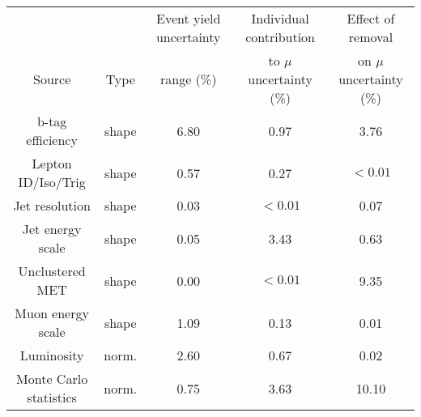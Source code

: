 \begin{adjustbox}{width=\textwidth,center=\textwidth}
\begin{tabular}{ccccc} \hline \hline
&  & Event yield uncertainty &Individual contribution & Effect of removal  \\
Source & Type & range (\%) &  to $\mu$ uncertainty (\%) & on $\mu$ uncertainty (\%) \\ \hline 
b-tag efficiency & shape & 6.80 & 0.97 & 3.76\\
Lepton ID/Iso/Trig & shape & 0.57 & 0.27 & $<0.01$\\
Jet resolution & shape & 0.03 & $<0.01$ & 0.07\\
Jet energy scale & shape & 0.05 & 3.43 & 0.63\\
Unclustered MET & shape & 0.00 & $<0.01$ & 9.35\\
Muon energy scale & shape & 1.09 & 0.13 & 0.01\\
Luminosity & norm. & 2.60 & 0.67 & 0.02\\
Monte Carlo statistics & norm. & 0.75 & 3.63 & 10.10\\
\hline 
\end{tabular}
\end{adjustbox}
